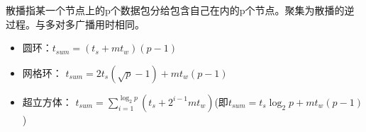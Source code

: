 \documentclass{article}
\begin{document}
\noindent{}散播指某一个节点上的p个数据包分给包含自己在内的p个节点。聚集为散播的逆过程。与多对多广播用时相同。%

\begin{itemize}[noitemsep,topsep=\mdcompacttopsep]%

\item{}圆环：$t_{sum} = (t_s + mt_w)(p - 1)$%

\item{}网格环： $t_{sum} = 2t_s(\sqrt {p} - 1) + mt_w(p  - 1)$%

\item{}超立方体：  $t_{sum} = \sum^{\log _2 p}_{i=1}{(t_s+2^{i - 1}m{t_w})}$(即$t_{sum} = t_s{\log _2 p} + mt_w(p - 1)$)%
\end{itemize}%
\end{document}
